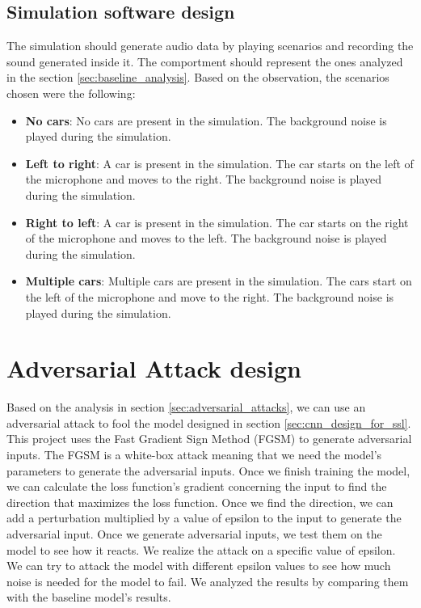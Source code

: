 \subsection{Simulation software design}

The simulation should generate audio data by playing scenarios and recording the sound generated inside it. The comportment should represent the ones analyzed in the section \ref{sec:baseline_analysis}. Based on the observation, the scenarios chosen were the following:

\begin{itemize}
    \item \textbf{No cars}: No cars are present in the simulation. The background noise is played during the simulation.
    \item \textbf{Left to right}: A car is present in the simulation. The car starts on the left of the microphone and moves to the right. The background noise is played during the simulation.
    \item \textbf{Right to left}: A car is present in the simulation. The car starts on the right of the microphone and moves to the left. The background noise is played during the simulation.
    \item \textbf{Multiple cars}: Multiple cars are present in the simulation. The cars start on the left of the microphone and move to the right. The background noise is played during the simulation.
\end{itemize}

\section{Adversarial Attack design}

Based on the analysis in section \ref{sec:adversarial_attacks}, we can use an adversarial attack to fool the model designed in section \ref{sec:cnn_design_for_ssl}. This project uses the Fast Gradient Sign Method (FGSM) to generate adversarial inputs. The FGSM is a white-box attack meaning that we need the model's parameters to generate the adversarial inputs. Once we finish training the model, we can calculate the loss function's gradient concerning the input to find the direction that maximizes the loss function. Once we find the direction, we can add a perturbation multiplied by a value of epsilon to the input to generate the adversarial input. 
Once we generate adversarial inputs, we test them on the model to see how it reacts. We realize the attack on a specific value of epsilon. We can try to attack the model with different epsilon values to see how much noise is needed for the model to fail. We analyzed the results by comparing them with the baseline model's results.

